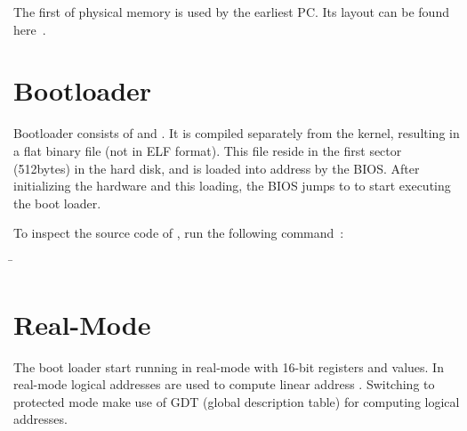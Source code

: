 \documentclass{article}
\begin{document}
The first  of physical memory is used by the earliest
PC. Its layout can be found here~\cite{yale-cs422-as1}.

\section{Bootloader}

Bootloader consists of  and . It is
compiled separately from the kernel, resulting in a flat binary file
 (not in ELF format). This file reside in the first
sector (512bytes) in the hard disk, and is loaded into address
\code{[0x7c00 - 0x7dff]} by the BIOS. After initializing the hardware
and this loading, the BIOS jumps to  to start executing
the boot loader.

To inspect the source code of , run the following command~\cite{disasm-flat}:

\begin{tabbing}
  \qquad\=\kill
  \> 
\end{tabbing}

\section{Real-Mode}

The boot loader start running in real-mode with 16-bit registers and
values. In real-mode logical addresses  are used
to compute linear address . Switching to
protected mode make use of GDT (global description table) for
computing logical addresses.



\end{document}
